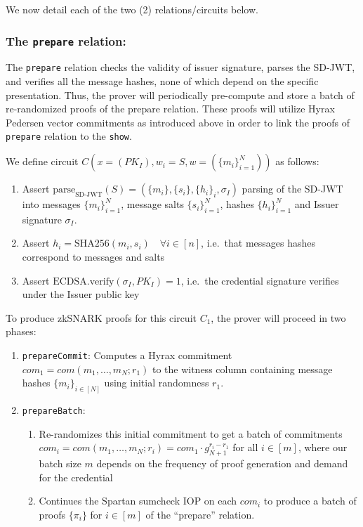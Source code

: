 We now detail each of the two (2) relations/circuits below.

\subsubsection{The \texttt{prepare} relation:}

The \texttt{prepare} relation checks the validity of issuer signature, parses the SD-JWT, and verifies all the message hashes, none of which depend on the specific presentation. 
Thus, the prover will periodically pre-compute and store a batch of re-randomized proofs of the prepare relation. 
These proofs will utilize Hyrax Pedersen vector commitments as introduced above in order to link the proofs of \texttt{prepare} relation to the \texttt{show}. 

\begin{mdframed}[style=zkprotocolwithheader, frametitle=Circuit $C_1$ for the \texttt{prepare} relation]

We define circuit $C(x = (PK_I), w_i = S, w = (\{m_i\}_{i=1}^N))$ as follows:

\begin{enumerate}
\item Assert $\text{parse}_{\text{SD-JWT}}(S) = (\{m_i\}, \{s_i\}, \{h_i\}_i, \sigma_I)$ parsing of the SD-JWT into messages $\{m_i\}_{i=1}^N$, message salts $\{s_i\}_{i=1}^N$, hashes $\{h_i\}_{i=1}^N$ and Issuer signature $\sigma_I$.
\item Assert $h_i = \text{SHA256}(m_i, s_i) \quad \forall i \in [n]$, i.e.\ that messages hashes correspond to messages and salts
\item Assert $\text{ECDSA.verify}(\sigma_I, PK_I) = 1$, i.e.\ the credential signature verifies under the Issuer public key
\end{enumerate}

\end{mdframed}

To produce zkSNARK proofs for this circuit $C_1$, the prover will proceed in two phases:
\begin{enumerate}
\item \texttt{prepareCommit}: Computes a Hyrax commitment $com_1 = com(m_1, \dots, m_N; r_1)$ to the witness column containing message hashes $\{m_i\}_{i \in [N]}$ using initial randomness $r_1$. 
\item \texttt{prepareBatch}: 
    \begin{enumerate}
        \item Re-randomizes this initial commitment to get a batch of commitments $com_i = com(m_1, \dots, m_N; r_i) = com_1 \cdot g_{N+1}^{r_i-r_1}$ for all $i \in [m]$, 
        where our batch size $m$ depends on the frequency of proof generation and demand for the credential
        \item Continues the Spartan sumcheck IOP on each $com_i$ to produce a batch of proofs $\{\pi_i\}$ for $i \in [m]$ of the ``prepare'' relation.
    \end{enumerate}
\end{enumerate}
    
